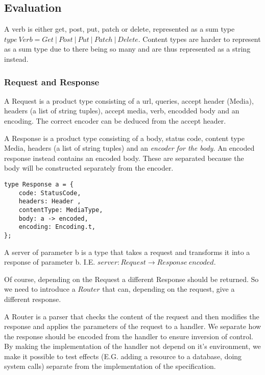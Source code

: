 \subsection{Evaluation}

\theoremstyle{definition}

A verb is either get, post, put, patch or delete, represented as a sum type
$type\ Verb = Get\ |\ Post\ |\ Put\ |\ Patch\ |\
Delete$. Content types are harder to represent as a sum type due to there being
so many and are thus represented as a string instead.

\subsubsection{Request and Response}

A Request is a product type consisting of a url, queries, accept header (Media),
headers (a list of string tuples), accept media, verb, encodded body and an
encoding. The correct encoder can be deduced from the accept header.

A Response is a product type consisting of a body, status code, content type
Media, headers (a list of string tuples) and an \textit{encoder for the body}.
An encoded response instead contains an encoded body. These are separated
because the body will be constructed separately from the encoder.

\begin{lstlisting}
type Response a = {
    code: StatusCode,
    headers: Header ,
    contentType: MediaType,
    body: a -> encoded,
    encoding: Encoding.t,
};
\end{lstlisting}

A server of parameter b is a type that takes a request and transforms it into a
response of parameter b. I.E.  $server : Request\rightarrow Response\ encoded$.

Of course, depending on the Request a different Response should be returned. So
we need to introduce a $Router$ that can, depending on the request, give a
different response. 

A Router is a parser that checks the content of the request and then modifies
the response and applies the parameters of the request to a handler. We separate
how the response should be encoded from the handler to ensure inversion of
control. By making the implementation of the handler not depend on it's
environment, we make it possible to test effects (E.G. adding a resource to a
database, doing system calls) separate from the implementation of the
specification. 

